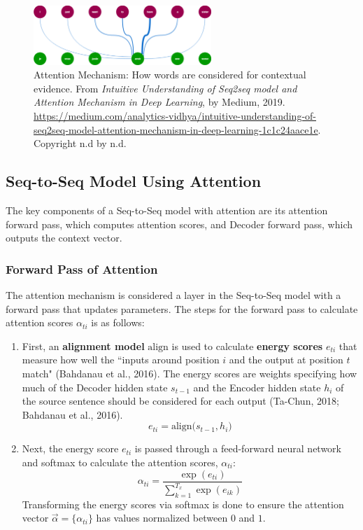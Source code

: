 \begin{figure}[h]
\centering
\includegraphics[width=0.6\textwidth]{imgs/attention.png}
\caption{\footnotesize Attention Mechanism: How words are considered for contextual evidence. From \emph{Intuitive Understanding of Seq2seq model and Attention Mechanism in Deep Learning}, by Medium, 2019. \url{https://medium.com/analytics-vidhya/intuitive-understanding-of-seq2seq-model-attention-mechanism-in-deep-learning-1c1c24aace1e}. Copyright n.d by n.d.}
\label{fig:attention}
\end{figure}

\subsection{Seq-to-Seq Model Using Attention}

The key components of a Seq-to-Seq model with attention are its attention forward pass, which computes attention scores, and Decoder forward pass, which outputs the context vector. 

\subsubsection{Forward Pass of Attention}

The attention mechanism is considered a layer in the Seq-to-Seq model with a forward pass that updates parameters. The steps for the forward pass to calculate attention scores $\alpha_{ti}$ is as follows: 
\begin{enumerate}
    \item First, an \textbf{alignment model} $\text{align}$ is used to calculate \textbf{energy scores} $e_{ti}$ that measure how well the ``inputs around position $i$ and the output at position $t$ match" (Bahdanau et al., 2016). The energy scores are weights specifying how much of the Decoder hidden state $s_{t-1}$ and the Encoder hidden state $h_i$ of the source sentence should be considered for each output (Ta-Chun, 2018; Bahdanau et al., 2016). 
    $$
    e_{ti} = \text{align} \Big(s_{t-1}, h_i \Big)
    $$ 
    
    \item Next, the energy score $e_{ti}$ is passed through a feed-forward neural network and softmax to calculate the attention scores, $\alpha_{ti}$:
    $$
    \alpha_{ti} = \frac{\exp{(e_{ti})} } { \sum_{k=1}^{T_x} \exp{(e_{ik})} }
    $$
    Transforming the energy scores via softmax is done to ensure the attention vector $\overrightarrow{\alpha} = \Big \{ \alpha_{ti} \Big \}$ has values normalized between $0$ and $1$. 
\end{enumerate}


